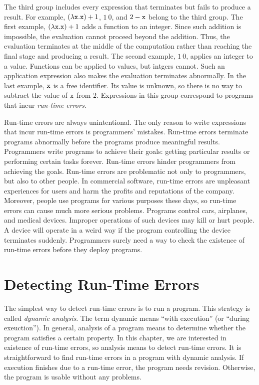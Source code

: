 The third group includes every expression that terminates but fails to produce
a result. For example, $(\lambda \texttt{x}.\texttt{x})+1$, $1\ 0$, and $2-\texttt{x}$
belong to the third group. The first example, $(\lambda \texttt{x}.\texttt{x})+1$
adds a function to an integer. Since such addition is impossible, the evaluation
cannot proceed beyond the addition. Thus, the evaluation terminates at the
middle of the computation rather than reaching the final stage and producing a
result. The second example, $1\ 0$, applies an integer to a value. Functions can
be applied to values, but intgers cannot. Such an application expression also
makes the evaluation terminates abnormally. In the last example, $\texttt{x}$ is a free
identifier. Its value is unknown, so there is no way to subtract the value of
$\texttt{x}$ from $2$. Expressions in this group correspond to programs that incur
\textit{run-time errors}.

Run-time errors are always unintentional. The only reason to write expressions
that incur run-time errors is programmers' mistakes. Run-time errors terminate
programs abnormally before the programs produce meaningful results. Programmers
write programs to achieve their goals: getting particular results or performing
certain tasks forever. Run-time errors hinder programmers from achieving the
goals. Run-time errors are problematic not only to programmers, but also to other
people. In commercial software, run-time errors are unpleasant experiences for users
and harm the profits and reputations of the company. Moreover,
people use programs for various purposes these days, so run-time errors can
cause much more serious problems. Programs control cars, airplanes, and medical
devices. Improper operations of such devices may kill or hurt people. A device
will operate in a weird way if the program controlling the device terminates suddenly.
Programmers surely need a way to check the existence of run-time errors before
they deploy programs.

\section{Detecting Run-Time Errors}

The simplest way to detect run-time errors is to run a program. This strategy is
called \textit{dynamic analysis}. The term dynamic
means ``with execution'' (or ``during exeuction''). In general, analysis of a
program means to determine whether the program satisfies a certain property. In
this chapter, we are interested in existence of run-time errors, so analysis
means to detect run-time errors.
It is straightforward to find run-time errors in a
program with dynamic analysis. If execution finishes due to a
run-time error, the program needs revision. Otherwise, the program is usable
without any problems.

